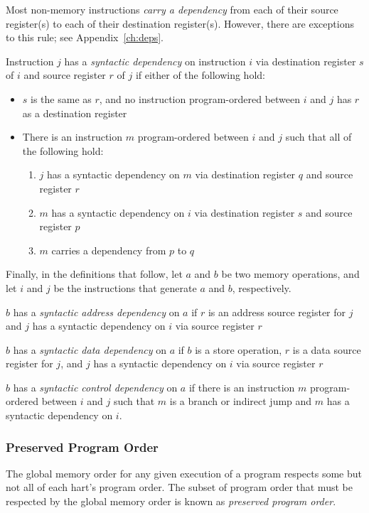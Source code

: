 Most non-memory instructions {\em carry a dependency} from each of their source register(s) to each of their destination register(s).
However, there are exceptions to this rule; see Appendix~\ref{ch:deps}.

Instruction $j$ has a {\em syntactic dependency} on instruction $i$ via destination register $s$ of $i$ and source register $r$ of $j$ if either of the following hold:
\begin{itemize}
  \item $s$ is the same as $r$, and no instruction program-ordered between $i$ and $j$ has $r$ as a destination register
  \item There is an instruction $m$ program-ordered between $i$ and $j$ such that all of the following hold:
    \begin{enumerate}
      \item $j$ has a syntactic dependency on $m$ via destination register $q$ and source register $r$
      \item $m$ has a syntactic dependency on $i$ via destination register $s$ and source register $p$
      \item $m$ carries a dependency from $p$ to $q$
    \end{enumerate}
\end{itemize}

Finally, in the definitions that follow, let $a$ and $b$ be two memory operations, and let $i$ and $j$ be the instructions that generate $a$ and $b$, respectively.

$b$ has a {\em syntactic address dependency} on $a$ if $r$ is an address source register for $j$ and $j$ has a syntactic dependency on $i$ via source register $r$

$b$ has a {\em syntactic data dependency} on $a$ if $b$ is a store operation, $r$ is a data source register for $j$, and $j$ has a syntactic dependency on $i$ via source register $r$

$b$ has a {\em syntactic control dependency} on $a$ if there is an instruction $m$ program-ordered between $i$ and $j$ such that $m$ is a branch or indirect jump and $m$ has a syntactic dependency on $i$.

\subsubsection*{Preserved Program Order}
The global memory order for any given execution of a program respects some but not all of each hart's program order.
The subset of program order that must be respected by the global memory order is known as {\em preserved program order}.


